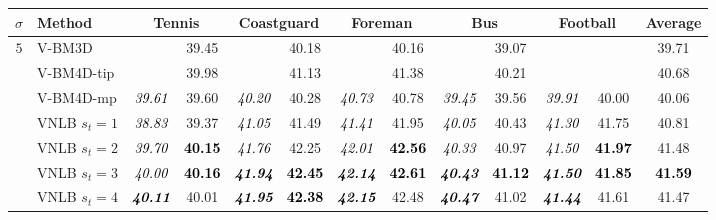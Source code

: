 \documentclass[10pt, a4paper]{article}
\newcommand{\best}[1]{#1}
\newcommand{\bsic}[1]{\textcolor{black}{\textit{#1}}}
\newcommand{\Bsic}[1]{\textcolor{black}{\textbf{\textit{#1}}}}
\newcommand{\Best}[1]{\textbf{\textcolor{black}{#1}}}
\begin{document}
\begin{table}[htp!]
	\begin{center}
		{\small
		\renewcommand{\tabcolsep}{1.6mm}
		\renewcommand{\arraystretch}{1.3}
		\begin{tabular}{ c | l |c c | c c | c c | c c | c c | c}
			\hline
			\rule{0pt}{10pt}$\sigma$ & Method            & \multicolumn{2}{c}{Tennis}  & \multicolumn{2}{c}{Coastguard}&\multicolumn{2}{c}{Foreman}& \multicolumn{2}{c}{Bus}     &\multicolumn{2}{c|}{Football}& Average\\\hline
			\multirow{1}{*}{$ 5$}
			                      & V-BM3D               & \bsic{     } &       39.45  & \bsic{     } &       40.18  & \bsic{     } &       40.16  & \bsic{     } &       39.07  & \bsic{     } &              &       39.71  \\
			                      & V-BM4D-tip           & \bsic{     } & \best{39.98} & \bsic{     } & \best{41.13} & \bsic{     } & \best{41.38} & \bsic{     } & \best{40.21} & \bsic{     } & \best{     } & \best{40.68} \\
			                      & V-BM4D-mp            & \bsic{39.61} &       39.60  & \bsic{40.20} &       40.28  & \bsic{40.73} &       40.78  & \bsic{39.45} &       39.56  & \bsic{39.91} &       40.00  &       40.06  \\
			                      & VNLB   $s_t = 1$     & \bsic{38.83} &       39.37  & \bsic{41.05} &       41.49  & \bsic{41.41} &       41.95  & \bsic{40.05} &       40.43  & \bsic{41.30} &       41.75  &       40.81  \\
			                      & VNLB   $s_t = 2$     & \bsic{39.70} & \Best{40.15} & \bsic{41.76} &       42.25  & \bsic{42.01} & \Best{42.56} & \bsic{40.33} &       40.97  & \bsic{41.50} & \Best{41.97} &       41.48  \\
			                      & VNLB   $s_t = 3$     & \bsic{40.00} & \Best{40.16} & \Bsic{41.94} & \Best{42.45} & \Bsic{42.14} & \Best{42.61} & \Bsic{40.43} & \Best{41.12} & \Bsic{41.50} & \Best{41.85} & \Best{41.59} \\
			                      & VNLB   $s_t = 4$     & \Bsic{40.11} &      {40.01} & \Bsic{41.95} & \Best{42.38} & \Bsic{42.15} &       42.48  & \Bsic{40.47} &       41.02  & \Bsic{41.44} &      {41.61} &       41.47  \\\hline

\end{tabular}}
\end{center}
\end{table}
\end{document}
